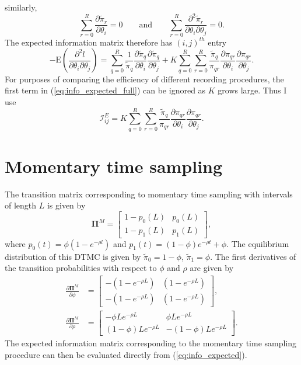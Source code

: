 \documentclass[11pt]{article}
\newcommand{\E}{\text{E}}
\newcommand{\Info}{\mathcal{I}}
\newcommand{\bs}{\boldsymbol}
\begin{document}
similarly, \[
\sum_{r=0}^R \frac{\partial \tilde{\pi}_r}{\partial \theta_i} = 0 \qquad \text{and} \qquad \sum_{r=0}^R \frac{\partial^2 \tilde{\pi}_r}{\partial \theta_i \partial \theta_j} = 0. \]
The expected information matrix therefore has $(i,j)^{th}$ entry
\begin{equation}
\label{eq:info_expected_full}
-\E\left(\frac{\partial^2 l}{\partial \theta_i \partial \theta_j} \right) =  \sum_{q=0}^R \frac{1}{\tilde{\pi}_q} \frac{\partial \tilde{\pi}_q}{\partial \theta_i} \frac{\partial \tilde{\pi}_q}{\partial \theta_j} +  K \sum_{q=0}^R \sum_{r=0}^R \frac{\tilde{\pi}_q}{\pi_{qr}} \frac{\partial \pi_{qr}}{\partial \theta_i}  \frac{\partial \pi_{qr}}{\partial \theta_j}.
\end{equation}
For purposes of comparing the efficiency of different recording procedures, the first term in (\ref{eq:info_expected_full}) can be ignored as $K$ grows large. Thus I use 
\begin{equation}
\label{eq:info_expected}
\Info^E_{ij} = K \sum_{q=0}^R \sum_{r=0}^R \frac{\tilde{\pi}_q}{\pi_{qr}} \frac{\partial \pi_{qr}}{\partial \theta_i}  \frac{\partial \pi_{qr}}{\partial \theta_j}.
\end{equation}

\section{Momentary time sampling}

The transition matrix corresponding to momentary time sampling with intervals of length $L$ is given by 
\begin{equation}
\bs\Pi^M = \left[\begin{array}{cc} 1 - p_0(L) & p_0(L) \\ 1 - p_1(L) & p_1(L) \end{array}\right],
\end{equation}
where $p_0(t) = \phi \left(1 - e^{- \rho l} \right)$ and $p_1(t) = (1 - \phi) e^{- \rho t} + \phi$. The equilibrium distribution of this DTMC is given by $\tilde{\pi}_0 = 1 - \phi$, $\tilde{\pi}_1 = \phi$. The first derivatives of the transition probabilities with respect to $\phi$ and $\rho$ are given by \begin{align*}
\frac{\partial \bs\Pi^M}{\partial \phi} &= \left[\begin{array}{cc} - (1 - e^{- \rho L}) & (1 - e^{- \rho L}) \\  - (1 - e^{- \rho L}) & (1 - e^{- \rho L}) \end{array}\right], \\
\frac{\partial \bs\Pi^M}{\partial \rho} &= \left[\begin{array}{cc} - \phi L  e^{- \rho L} & \phi L e^{- \rho L} \\  (1 - \phi) L e^{- \rho L} & -(1 - \phi) L e^{- \rho L} \end{array}\right].
\end{align*}
The expected information matrix corresponding to the momentary time sampling procedure can then be evaluated directly from (\ref{eq:info_expected}). 
\end{document}
